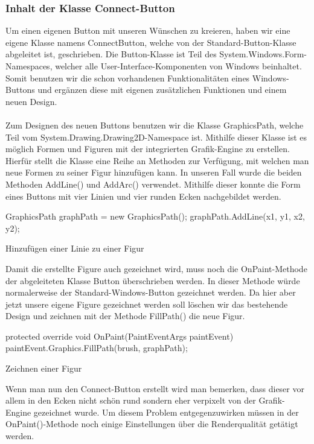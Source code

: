 \subsubsection{Inhalt der Klasse Connect-Button}

Um einen eigenen Button mit unseren Wünschen zu kreieren, haben wir eine eigene Klasse namens ConnectButton, welche von der Standard-Button-Klasse abgeleitet ist, geschrieben. Die Button-Klasse ist Teil des System.Windows.Form-Namespaces, welcher alle User-Interface-Komponenten von Windows beinhaltet. Somit benutzen wir die schon vorhandenen Funktionalitäten eines Windows-Buttons und ergänzen diese mit eigenen zusätzlichen Funktionen und einem neuen Design.
\\ \ \\
Zum Designen des neuen Buttons benutzen wir die Klasse GraphicsPath, welche Teil vom System.Drawing.Drawing2D-Namespace ist. Mithilfe dieser Klasse ist es möglich Formen und Figuren mit der integrierten Grafik-Engine zu erstellen. Hierfür stellt die Klasse eine Reihe an Methoden zur Verfügung, mit welchen man neue Formen zu seiner Figur hinzufügen kann. In unseren Fall wurde die beiden Methoden AddLine() und AddArc() verwendet. Mithilfe dieser konnte die Form eines Buttons mit vier Linien und vier runden Ecken nachgebildet werden.

\begin{program}[H]
\begin{CSharpCode}
GraphicsPath graphPath = new GraphicsPath();
graphPath.AddLine(x1, y1, x2, y2);
\end{CSharpCode}
\caption{Hinzufügen einer Linie zu einer Figur}
\end{program}
\noindent 
Damit die erstellte Figure auch gezeichnet wird, muss noch die OnPaint-Methode der abgeleiteten Klasse Button überschrieben werden. In dieser Methode würde normalerweise der Standard-Windows-Button gezeichnet werden. Da hier aber jetzt unsere eigene Figure gezeichnet werden soll löschen wir das bestehende Design und zeichnen mit der Methode FillPath() die neue Figur.

\begin{program}[H]
\begin{CSharpCode}
protected override void OnPaint(PaintEventArgs paintEvent)
{
    paintEvent.Graphics.FillPath(brush, graphPath);
}
\end{CSharpCode}
\caption{Zeichnen einer Figur}
\end{program}
\noindent 
Wenn man nun den Connect-Button erstellt wird man bemerken, dass dieser vor allem in den Ecken nicht schön rund sondern eher verpixelt von der Grafik-Engine gezeichnet wurde. Um diesem Problem entgegenzuwirken müssen in der OnPaint()-Methode noch einige Einstellungen über die Renderqualität getätigt werden.

